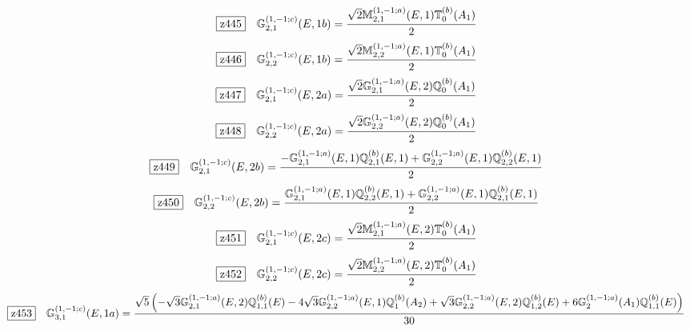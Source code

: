 \documentclass[fleqn,10pt,landscape]{jsarticle}
\begin{document}
\begin{dmath*}
\hspace*{3mm}\fbox{z445}\quad \mathbb{G}_{2,1}^{(1,-1;c)}(E,1b)=\frac{\sqrt{2} \mathbb{M}_{2,1}^{(1,-1;a)}(E,1) \mathbb{T}_{0}^{(b)}(A_{1})}{2}
\end{dmath*}
\begin{dmath*}
\hspace*{3mm}\fbox{z446}\quad \mathbb{G}_{2,2}^{(1,-1;c)}(E,1b)=\frac{\sqrt{2} \mathbb{M}_{2,2}^{(1,-1;a)}(E,1) \mathbb{T}_{0}^{(b)}(A_{1})}{2}
\end{dmath*}
\begin{dmath*}
\hspace*{3mm}\fbox{z447}\quad \mathbb{G}_{2,1}^{(1,-1;c)}(E,2a)=\frac{\sqrt{2} \mathbb{G}_{2,1}^{(1,-1;a)}(E,2) \mathbb{Q}_{0}^{(b)}(A_{1})}{2}
\end{dmath*}
\begin{dmath*}
\hspace*{3mm}\fbox{z448}\quad \mathbb{G}_{2,2}^{(1,-1;c)}(E,2a)=\frac{\sqrt{2} \mathbb{G}_{2,2}^{(1,-1;a)}(E,2) \mathbb{Q}_{0}^{(b)}(A_{1})}{2}
\end{dmath*}
\begin{dmath*}
\hspace*{3mm}\fbox{z449}\quad \mathbb{G}_{2,1}^{(1,-1;c)}(E,2b)=\frac{- \mathbb{G}_{2,1}^{(1,-1;a)}(E,1) \mathbb{Q}_{2,1}^{(b)}(E,1) + \mathbb{G}_{2,2}^{(1,-1;a)}(E,1) \mathbb{Q}_{2,2}^{(b)}(E,1)}{2}
\end{dmath*}
\begin{dmath*}
\hspace*{3mm}\fbox{z450}\quad \mathbb{G}_{2,2}^{(1,-1;c)}(E,2b)=\frac{\mathbb{G}_{2,1}^{(1,-1;a)}(E,1) \mathbb{Q}_{2,2}^{(b)}(E,1) + \mathbb{G}_{2,2}^{(1,-1;a)}(E,1) \mathbb{Q}_{2,1}^{(b)}(E,1)}{2}
\end{dmath*}
\begin{dmath*}
\hspace*{3mm}\fbox{z451}\quad \mathbb{G}_{2,1}^{(1,-1;c)}(E,2c)=\frac{\sqrt{2} \mathbb{M}_{2,1}^{(1,-1;a)}(E,2) \mathbb{T}_{0}^{(b)}(A_{1})}{2}
\end{dmath*}
\begin{dmath*}
\hspace*{3mm}\fbox{z452}\quad \mathbb{G}_{2,2}^{(1,-1;c)}(E,2c)=\frac{\sqrt{2} \mathbb{M}_{2,2}^{(1,-1;a)}(E,2) \mathbb{T}_{0}^{(b)}(A_{1})}{2}
\end{dmath*}
\begin{dmath*}
\hspace*{3mm}\fbox{z453}\quad \mathbb{G}_{3,1}^{(1,-1;c)}(E,1a)=\frac{\sqrt{5} \left(- \sqrt{3} \mathbb{G}_{2,1}^{(1,-1;a)}(E,2) \mathbb{Q}_{1,1}^{(b)}(E) - 4 \sqrt{3} \mathbb{G}_{2,2}^{(1,-1;a)}(E,1) \mathbb{Q}_{1}^{(b)}(A_{2}) + \sqrt{3} \mathbb{G}_{2,2}^{(1,-1;a)}(E,2) \mathbb{Q}_{1,2}^{(b)}(E) + 6 \mathbb{G}_{2}^{(1,-1;a)}(A_{1}) \mathbb{Q}_{1,1}^{(b)}(E)\right)}{30}
\end{dmath*}
\end{document}
